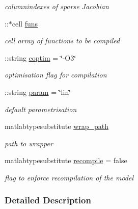\begin{DoxyCompactItemize}
\begin{DoxyCompactList}\small\item\em columnindexes of sparse Jacobian \end{DoxyCompactList}\item 
\hypertarget{classamimodel_af80b2560853c3df2b09fef2a198cf5b8}{}\+::$\ast$cell \hyperlink{classamimodel_af80b2560853c3df2b09fef2a198cf5b8}{funs}\label{classamimodel_af80b2560853c3df2b09fef2a198cf5b8}

\begin{DoxyCompactList}\small\item\em cell array of functions to be compiled \end{DoxyCompactList}\item 
\+::string \hyperlink{classamimodel_ad99abcd270ac97546c46292ebc6c2e0a}{coptim} = \char`\"{}-\/O3\char`\"{}
\begin{DoxyCompactList}\small\item\em optimisation flag for compilation \end{DoxyCompactList}\item 
\+::string \hyperlink{classamimodel_a51f20d6b1b54a2eee3be0e8adc96a0ae}{param} = \char`\"{}lin\char`\"{}
\begin{DoxyCompactList}\small\item\em default parametrisation \end{DoxyCompactList}\item 
\hypertarget{classamimodel_a0b316a20054ba282555674d939a82406}{}matlabtypesubstitute \hyperlink{classamimodel_a0b316a20054ba282555674d939a82406}{wrap\+\_\+path}\label{classamimodel_a0b316a20054ba282555674d939a82406}

\begin{DoxyCompactList}\small\item\em path to wrapper \end{DoxyCompactList}\item 
matlabtypesubstitute \hyperlink{classamimodel_a8d2e824e03e32034b634a7c48f2a26c6}{recompile} = false
\begin{DoxyCompactList}\small\item\em flag to enforce recompilation of the model \end{DoxyCompactList}\end{DoxyCompactItemize}


\subsubsection{Detailed Description}


